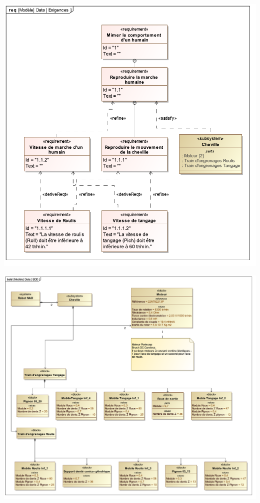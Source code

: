 \documentclass[10pt,fleqn]{article} %
\begin{document}
\begin{multicols}{2}
\ifprof
\else

\begin{center}
\includegraphics[width=\linewidth]{images/req.pdf}
\end{center}
\begin{center}
\includegraphics[width=\linewidth]{images/bdd.pdf}
\end{center}


\end{multicols}
\end{document}
